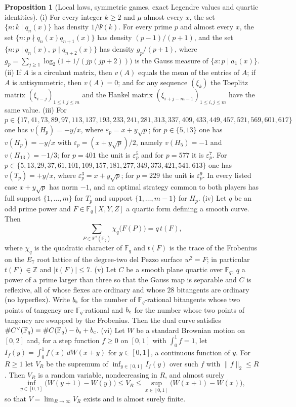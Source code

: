 \documentclass[11pt]{article}
\theoremstyle{definition}
\newcommand{\Fq}{\mathbb F}
\newcommand{\Z}{\mathbb Z}
\newcommand{\eps}{\varepsilon}
\providecommand{\Z}{\mathbb Z}
\newtheorem{proposition}{Proposition}
\begin{document}
\begin{proposition}[Local laws, symmetric games, exact Legendre values and quartic identities]\label{at:basic}
{\rm(i)} For every integer $k\ge2$ and $\mu$-almost every $x$, the set
$\{n:k\mid q_n(x)\}$ has density $1/\Psi(k)$.  For every prime $p$ and
almost every $x$, the set $\{n: p\nmid q_n(x)q_{n+1}(x)\}$ has density
$(p-1)/(p+1)$, and the set $\{n:p\mid q_n(x),\ p\mid q_{n+2}(x)\}$ has
density $g_p/(p+1)$, where
$g_p=\sum_{j\ge1}\log_2\bigl(1+1/(jp(jp+2))\bigr)$ is the Gauss measure of
$\{x:p\mid a_1(x)\}$.
{\rm(ii)} If $A$ is a circulant matrix, then $v(A)$ equals the mean of the
entries of $A$; if $A$ is antisymmetric, then $v(A)=0$; and for any
sequence $(\xi_k)$ the Toeplitz matrix $(\xi_{i-j})_{1\le i,j\le m}$ and the
Hankel matrix $(\xi_{i+j-m-1})_{1\le i,j\le m}$ have the same value.
{\rm(iii)} For
$p\in\{17,41,73,89,97,113,137,193,233,241,281,313,337,409,433,449,457,521,569,601,617\}$
one has $v(H_p)=-y/x$, where $\eps_p=x+y\sqrt p$; for $p\in\{5,13\}$ one
has $v(H_p)=-y/x$ with $\eps_p=(x+y\sqrt p)/2$, namely $v(H_5)=-1$ and
$v(H_{13})=-1/3$; for $p=401$ the unit is $\eps_p^5$ and for $p=577$ it is
$\eps_p^7$.  For
$p\in\{5,13,29,37,61,101,109,157,181,277,349,373,421,541,613\}$ one has
$v(T_p)=+y/x$, where $\eps_p^3=x+y\sqrt p$; for $p=229$ the unit is
$\eps_p^9$.  In every listed case $x+y\sqrt p$ has norm $-1$, and an optimal strategy
common to both players has full support $\{1,\dots,m\}$ for $T_p$ and
support $\{1,\dots,m-1\}$ for $H_p$.
{\rm(iv)} Let $q$ be an odd prime power and $F\in\Fq_q[X,Y,Z]$ a quartic
form defining a smooth curve.  Then
\[
 \sum_{P\in\mathbb P^2(\Fq_q)}\chi_q\bigl(F(P)\bigr)=q\,t(F),
\]
where $\chi_q$ is the quadratic character of $\Fq_q$ and $t(F)$ is the trace
of the Frobenius on the $E_7$ root lattice of the degree-two del Pezzo
surface $w^2=F$; in particular $t(F)\in\Z$ and $|t(F)|\le7$.
{\rm(v)} Let $C$ be a smooth plane quartic over $\Fq_q$, $q$ a power of a
prime larger than three so that the Gauss map is separable and $C$ is
reflexive, all of whose flexes are ordinary and whose $28$ bitangents are
ordinary (no hyperflex).  Write $b_{\rm s}$ for the
number of $\Fq_q$-rational bitangents whose two points of tangency are
$\Fq_q$-rational and $b_{\rm c}$ for the number whose two points of tangency
are swapped by the Frobenius.  Then the dual curve satisfies
$\#C^\vee(\Fq_q)=\#C(\Fq_q)-b_{\rm s}+b_{\rm c}$.
{\rm(vi)} Let $W$ be a standard Brownian motion on $[0,2]$ and, for a step
function $f\ge0$ on $[0,1]$ with $\int_0^1f=1$, let
$I_f(y)=\int_0^1f(x)\,dW(x+y)$ for $y\in[0,1]$, a continuous function of
$y$.  For $R\ge1$ let $V_R$ be the supremum of $\inf_{y\in[0,1]}I_f(y)$
over such $f$ with $\|f\|_2\le R$.  Then $V_R$ is a random variable,
nondecreasing in $R$, and almost surely
\[
 \inf_{y\in[0,1]}\bigl(W(y+1)-W(y)\bigr)\le V_R\le
 \sup_{x\in[0,1]}\bigl(W(x+1)-W(x)\bigr),
\]
so that $V=\lim_{R\to\infty}V_R$ exists and is almost surely finite.
\end{proposition}
\end{document}

